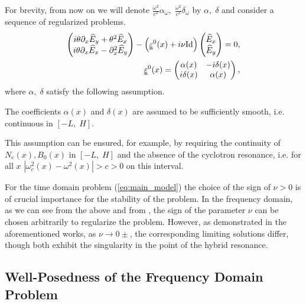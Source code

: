 For brevity, from now on we will denote $\frac{\omega^2}{c^2}\alpha_{\omega},\; \frac{\omega^2}{c^2}\delta_{\omega}$ by $\alpha,\; \delta$ and consider a sequence of regularized problems. 
\begin{align}
\label{eq:main_frequency_domain}
\left(
\begin{matrix}
 i\theta \partial_x \widehat{E}_y+\theta^2 \widehat{E}_x\\
 i\theta \partial_x \widehat{E}_x -\partial_x^2 \widehat{E}_y
\end{matrix}
\right)-
\left(\uuline{\varepsilon}^{0}(x)+i\nu \mathrm{Id}\right)\left(
\begin{matrix}
 \widehat{E}_x\\
 \widehat{E}_y
\end{matrix}
\right)
=0,\\
\label{eq:epsilon_0}
\uuline{\varepsilon}^{0}(x)=\left(
\begin{matrix}
 \alpha(x) & -i\delta(x) \\
 i\delta(x) & \alpha(x)
\end{matrix}
\right),
\end{align}
where $\alpha,\;\delta$ satisfy the following assumption.


\begin{assumption}
\label{assumption:smooth}
The coefficients  $\alpha(x)$ and $\delta(x)$ are assumed to be sufficiently smooth, i.e. continuous in  
$\left[-L,\; H\right]$.
\end{assumption}
This assumption can be ensured, for example, by requiring the continuity of $N_e(x), B_0(x)$ in $[-L,\;H]$ and the absence of the cyclotron resonance, i.e. for all $x$ $|\omega_c^2(x)-\omega^2(x)|>c>0$ on this interval. 

\begin{remark}
For the time domain problem (\ref{eq:main_model}) the choice of the sign of $\nu>0$ is of crucial importance for the stability of the problem. 
In the frequency domain, as we can see from the above and from \cite{Despres_2014,LMIG_thesis}, the sign 
of the parameter $\nu$ can be chosen arbitrarily to regularize the problem. 
However, as demonstrated in the aforementioned works, as $\nu\rightarrow 0\pm$, the 
corresponding limiting solutions differ, though both exhibit the singularity in the point of the hybrid resonance.  
\end{remark}

\subsection{Well-Posedness of the Frequency Domain Problem}
\label{sec:wellposedness}

